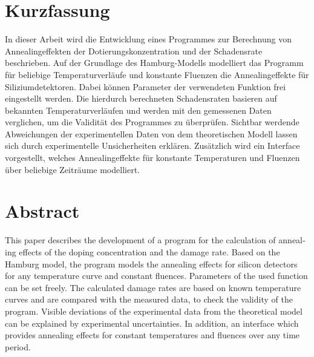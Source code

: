 \thispagestyle{plain}

\section*{Kurzfassung}
In dieser Arbeit wird die Entwicklung eines Programmes zur
Berechnung von Annealingeffekten der Dotierungskonzentration und der Schadensrate
beschrieben. Auf der Grundlage des Hamburg-Modells modelliert das Programm für beliebige
Temperaturverläufe und konstante Fluenzen die Annealingeffekte für Siliziumdetektoren.
Dabei können Parameter der verwendeten Funktion frei eingestellt werden.
Die hierdurch berechneten Schadensraten basieren auf bekannten Temperaturverläufen und werden mit den gemessenen Daten verglichen,
um die Validität des Programmes zu überprüfen. Sichtbar werdende Abweichungen der
experimentellen Daten von dem theoretischen Modell lassen sich durch experimentelle Unsicherheiten erklären.
Zusätzlich wird ein Interface vorgestellt, welches Annealingeffekte für konstante Temperaturen und Fluenzen
über beliebige Zeiträume modelliert.

\section*{Abstract}
\begin{english}
  This paper describes the development of a program for the calculation of annealing effects of the doping concentration and the damage rate.
  Based on the Hamburg model, the program models the annealing effects for silicon detectors for any temperature curve and constant fluences.
  Parameters of the used function can be set freely.
  The calculated damage rates are based on known temperature curves and are compared with the measured data,
  to check the validity of the program.
   Visible deviations of the experimental data from the theoretical model can be explained by experimental uncertainties. In addition, an interface which provides annealing effects for constant temperatures and fluences over any time period.



\end{english}
